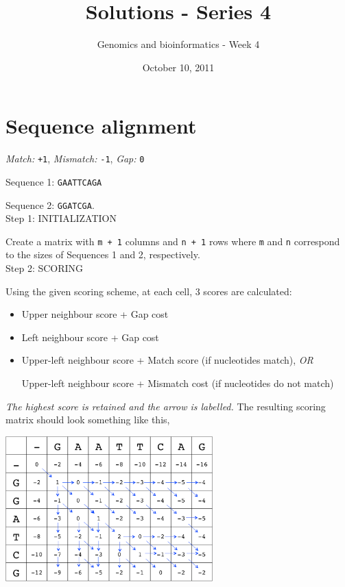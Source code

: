 \documentclass[a4paper,11pt]{article}
\title{Solutions - Series 4}
\date{October 10, 2011}
\author{Genomics and bioinformatics - Week 4}
\begin{document}
\maketitle

\section{Sequence alignment}

\emph{Match:}  \texttt{+1}, \emph{Mismatch:} \texttt{-1}, \emph{Gap:} \texttt{0}

Sequence 1: \texttt{GAATTCAGA}

Sequence 2: \texttt{GGATCGA}.\\

Step 1: INITIALIZATION

Create a matrix with \texttt{m + 1} columns and \texttt{n + 1} rows where \texttt{m} and \texttt{n} correspond to the sizes of Sequences 1 and 2, respectively. \\


Step 2: SCORING

Using the given scoring scheme, at each cell, 3 scores are calculated:
\begin{itemize}
\item Upper neighbour score + Gap cost
\item Left neighbour score + Gap cost
\item Upper-left neighbour score + Match score (if nucleotides match), \emph{OR} 

Upper-left neighbour score + Mismatch cost (if nucleotides do not match)
\end{itemize}

\indent\emph{The highest score is retained and the arrow is labelled.} The resulting scoring matrix should look something like this, \\

\begin{center}
\includegraphics[width=0.6\textwidth]{scoring.png}\\
\end{center}
\end{document}
